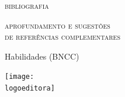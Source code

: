 \documentclass[smaller,professionalfonts,15pt]{beamer}
\begin{document}
\begin{frame}
\hfill\Huge
\textsc{bibliografia}
\end{frame}


\begin{frame}
\hfill\Huge
\textsc{aprofundamento e sugestões\\\hfill de referências complementares}
\end{frame}



\begin{frame}[plain]{Habilidades (BNCC)}
\vspace{-2cm}
\end{frame}





\begin{frame}
\centering\hfill\texttt{[image: \\logoeditora]}
\end{frame}
\end{document}
